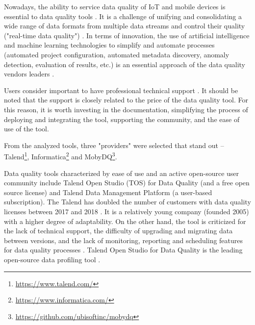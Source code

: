       		Nowadays, the ability to service data quality of IoT and mobile devices is essential to data quality tools \cite{Pearlman2019a}. It is a challenge of unifying and consolidating a wide range of data formats from multiple data streams and control their quality ("real-time data quality") \cite{Pearlman2019a}. In terms of innovation, the use of artificial intelligence and machine learning technologies to simplify and automate processes (automated project configuration, automated metadata discovery, anomaly detection, evaluation of results, etc.) is an essential approach of the data quality vendors leaders \cite{Chien2019}.
      		
      		Users consider important to have professional technical support \cite{Chien2019}. It should be noted that the support is closely related to the price of the data quality tool. For this reason, it is worth investing in the documentation, simplifying the process of deploying and integrating the tool, supporting the community, and the ease of use of the tool.
      		
      		From the analyzed tools, three "providers" were selected that stand out -- Talend\footnote{\url{https://www.talend.com/}}, Informatica\footnote{\url{https://www.informatica.com/}} and MobyDQ\footnote{\url{https://github.com/ubisoftinc/mobydq}}.
      		
      		Data quality tools characterized by ease of use and an active open-source user community include Talend Open Studio (TOS) for Data Quality (and a free open source license) and Talend Data Management Platform (a user-based subscription)\cite{Ehrlinger2019}. The Talend has doubled the number of customers with data quality licenses between 2017 and 2018 \cite{Chien2019}. It is a relatively young company (founded 2005) with a higher degree of adaptability. On the other hand, the tool is criticized for the lack of technical support, the difficulty of upgrading and migrating data between versions, and the lack of monitoring, reporting and scheduling features for data quality processes \cite{Chien2019}. Talend Open Studio for Data Quality is the leading open-source data profiling tool \cite{Ehrlinger2019}.
      		
